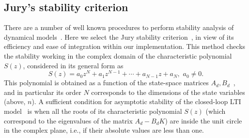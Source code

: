 \subsection{Jury's stability criterion} 
\label{ssec:stabspecification}


There are a number of well known procedures to perform stability analysis of dynamical models~\cite{Astrom08}. 
Here we select the Jury stability criterion~\cite{astrom1997computer}, 
in view of its efficiency and ease of integration within our implementation.  
This method checks the stability working in the complex domain of the characteristic polynomial $S(z)$,  
%
%
considered in its general form as 
%
\begin{equation*}
S(z) = a_0z^N+a_1z^{N-1}+\cdots+a_{N-1}z+a_N,\,\, a_0\neq0. 
\end{equation*}
This polynomial is obtained as a function of the state-space matrices $A_d,B_d$~\cite{Astrom08}, 
and in particular its order $N$ corresponds to the dimensions of the state variables (above, $n$).  
A sufficient condition for asymptotic stability of the closed-loop LTI model~\cite{astrom1997computer} 
is when all the roots of its characteristic polynomial $S(z)$ (which correspond to the 
eigenvalues of the matrix $A_d-B_dK$) are inside the unit circle in the complex plane, 
i.e., if their absolute values are less than one. 



